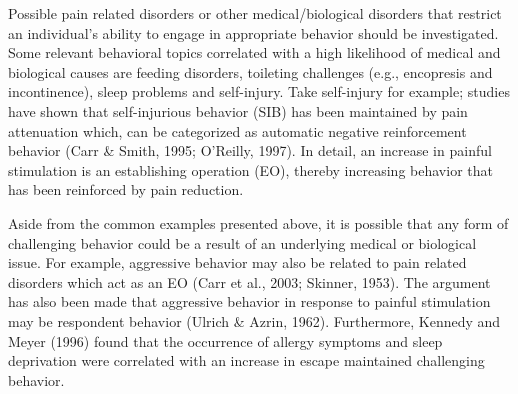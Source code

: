Possible pain related disorders or other medical/biological disorders that restrict an individual's ability to engage in appropriate behavior should be investigated.  Some relevant behavioral topics correlated with a high likelihood of medical and biological causes are feeding disorders, toileting challenges (e.g., encopresis and incontinence), sleep problems and self-injury. Take self-injury for example; studies have shown that self-injurious behavior (SIB) has been maintained by pain attenuation which, can be categorized as automatic negative reinforcement behavior (Carr \& Smith, 1995; O'Reilly, 1997).  In detail, an increase in painful stimulation is an establishing operation (EO), thereby increasing behavior that has been reinforced by pain reduction.

Aside from the common examples presented above, it is possible that any form of challenging behavior could be a result of an underlying medical or biological issue. For example, aggressive behavior may also be related to pain related disorders which act as an EO (Carr et al., 2003; Skinner, 1953). The argument has also been made that aggressive behavior in response to painful stimulation may be respondent behavior (Ulrich \& Azrin, 1962). Furthermore, Kennedy and Meyer (1996) found that the occurrence of allergy symptoms and sleep deprivation were correlated with an increase in escape maintained challenging behavior. 

